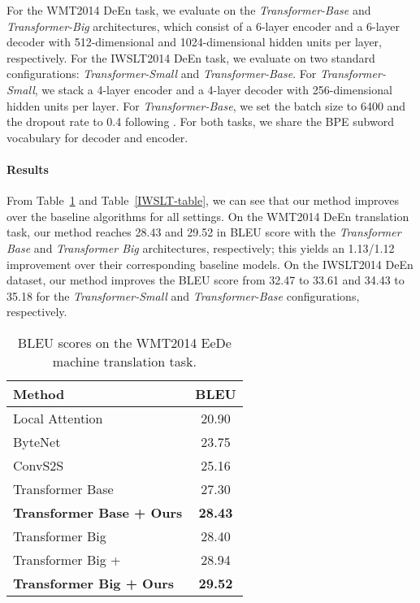 \documentclass{article}
\begin{document}
For the WMT2014 DeEn task,
we evaluate on the \textit{Transformer-Base} and \textit{Transformer-Big} architectures,
which consist of a 6-layer encoder and a 6-layer decoder with 512-dimensional and 1024-dimensional hidden units per layer, respectively. 
For the IWSLT2014 DeEn task, 
we evaluate on two standard configurations: \textit{Transformer-Small} and \textit{Transformer-Base}.
For \textit{Transformer-Small}, we stack a 4-layer encoder and a 4-layer decoder with 256-dimensional hidden units per layer. For \textit{Transformer-Base}, we set the batch size to 6400 and the dropout rate to 0.4 following \citet{wang2018multiagent}. For both tasks, we share the BPE subword vocabulary for decoder and encoder.


\paragraph{Results}
From Table~\ref{WMT-table} and Table~\ref{IWSLT-table}, 
we can see that our method
improves over the baseline algorithms for all settings.  
On the WMT2014 DeEn translation task, 
our method reaches 28.43 and 29.52 in BLEU score 
with the \textit{Transformer Base} and \textit{Transformer Big} architectures,  respectively; 
this yields an 1.13/1.12 improvement over their corresponding baseline models. 
On the IWSLT2014 DeEn dataset,
our method improves the BLEU score from 32.47 to  33.61 and 34.43 to 35.18 for the  \textit{Transformer-Small} and \textit{Transformer-Base} configurations, respectively.




















\begin{table}[ht]
  	\begin{center}
  	\setlength\extrarowheight{1.5pt}
	\begin{tabular}{lc}
\toprule 
\bf  Method & \bf  BLEU \\
\hline
Local Attention~\cite{luong2015effective} &  20.90 \\
ByteNet~\cite{kalchbrenner2016neural} &  23.75 \\
ConvS2S~\cite{gehring2017convolutional} &  25.16 \\
\hline
Transformer Base ~\cite{vaswani2017attention}&  27.30 \\
\bf{Transformer Base + Ours} &  \bf {28.43} \\
\hline
Transformer Big ~\cite{vaswani2017attention}&  28.40 \\
Transformer Big + ~\cite{gao2018representation} &  28.94 \\
\bf{Transformer Big + Ours} &  \bf{29.52} \\
\bottomrule 
\end{tabular}
\end{center}
\caption{\label{WMT-table}  BLEU scores on the WMT2014 EeDe machine translation task. }
\end{table}
\end{document}
